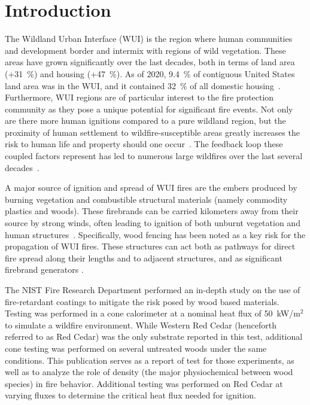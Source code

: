 \documentclass[12pt]{article}
\begin{document}
\section{Introduction}
\label{sec:intro}
The Wildland Urban Interface (WUI) is the region where human communities and development border and intermix with regions of wild vegetation. These areas have grown significantly over the last decades, both in terms of land area (+31~\%) and housing (+47~\%). As of 2020, 9.4~\% of contiguous United States land area was in the WUI, and it contained 32~\% of all domestic housing~\cite{mockrin2023wui}. Furthermore, WUI regions are of particular interest to the fire protection community as they pose a unique potential for significant fire events. Not only are there more human ignitions compared to a pure wildland region, but the proximity of human settlement to wildfire-susceptible areas greatly increases the risk to human life and property should one occur~\cite{tang2024global}. The feedback loop these coupled factors represent has led to numerous large wildfires over the last several decades~\cite{mietkiewicz2020line}.

A major source of ignition and spread of WUI fires are the embers produced by burning vegetation and combustible structural materials (namely commodity plastics and woods). These firebrands can be carried kilometers away from their source by strong winds, often leading to ignition of both unburnt vegetation and human structures~\cite{dubrulle2020effect,manzello2014characterizing,fernandez2017wildland,yang2023experimental}. Specifically, wood fencing has been noted as a key risk for the propagation of WUI fires. These structures can act both as pathways for direct fire spread along their lengths and to adjacent structures, and as significant firebrand generators \cite{dubrulle2020effect,johnsson2016effects}.

The NIST Fire Research Department performed an in-depth study on the use of fire-retardant coatings to mitigate the risk posed by wood based materials. Testing was performed in a cone calorimeter at a nominal heat flux of 50~kW/m$^{2}$ to simulate a wildfire environment\cite{dubrulle2020effect}. While Western Red Cedar (henceforth referred to as Red Cedar) was the only substrate reported in this test, additional cone testing was performed on several untreated woods under the same conditions. This publication serves as a report of test for those experiments, as well as to analyze the role of density (the major physiochemical between wood species) in fire behavior. Additional testing was performed on Red Cedar at varying fluxes to determine the critical heat flux needed for ignition. 
\end{document}
